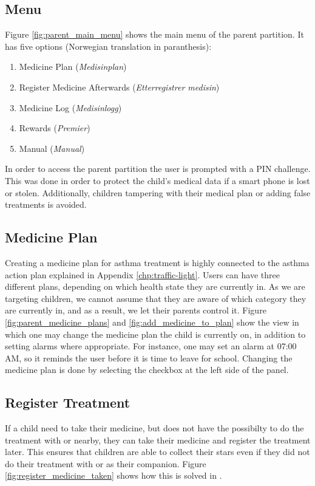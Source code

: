 \subsection{Menu}
\label{sec:description-menu}
Figure \ref{fig:parent_main_menu} shows the main menu of the parent partition. It has five options (Norwegian translation in paranthesis):
\begin{enumerate}
  \item Medicine Plan (\emph{Medisinplan})
  \item Register Medicine Afterwards (\emph{Etterregistrer medisin})
  \item Medicine Log (\emph{Medisinlogg})
  \item Rewards (\emph{Premier})
  \item Manual (\emph{Manual})
\end{enumerate} 

In order to access the parent partition the user is prompted with a PIN challenge. This was done in order to protect the child's medical data if a smart phone is lost or stolen. Additionally, children tampering with their medical plan or adding false treatments is avoided.

\subsection{Medicine Plan}
\label{sec:description-medicine-plan}
Creating a medicine plan for asthma treatment is highly connected to the asthma action plan explained in Appendix \ref{chp:traffic-light}.
Users can have three different plans, depending on which health state they are currently in. As we are targeting children, we cannot assume that they are aware of which category they are currently in, and as a result, we let their parents control it. Figure \ref{fig:parent_medicine_plans} and \ref{fig:add_medicine_to_plan} show the view in which one may change the medicine plan the child is currently on, in addition to setting alarms where appropriate. For instance, one may set an alarm at 07:00 AM, so it reminds the user before it is time to leave for school. Changing the medicine plan is done by selecting the checkbox at the left side of the panel.  


\subsection{Register Treatment}
\label{sec:description-register-medicine}

If a child need to take their medicine, but does not have the possibilty to do the treatment with \ab{} or \app{} nearby, they can take their medicine and register the treatment later. This ensures that children are able to collect their stars even if they did not do their treatment with \ab{} or \app{} as their companion. Figure \ref{fig:register_medicine_taken} shows how this is solved in \app{}.  

